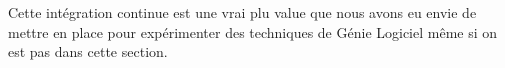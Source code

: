 Cette intégration continue est une vrai plu value que nous avons eu envie de mettre en place pour expérimenter des techniques de Génie Logiciel même si on est pas dans cette section.










